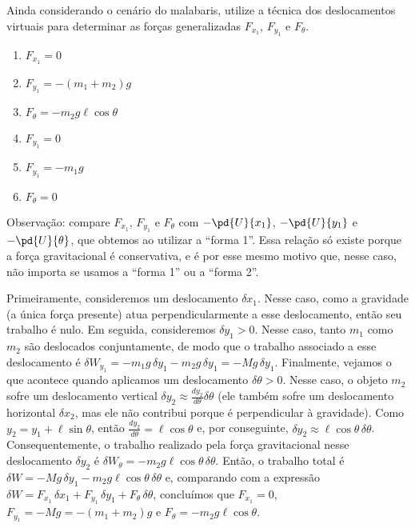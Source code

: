\begin{question}
  	Ainda considerando o cenário do malabaris, utilize a técnica dos deslocamentos virtuais para determinar as forças generalizadas $F_{x_1}$, $F_{y_1}$ e $F_\theta$.

  	\begin{enumerate}
  		\item $F_{x_1} = 0$ \rightanswer
  		\item $F_{y_1} = -(m_1 + m_2)g$ \rightanswer
  		\item $F_\theta = -m_2 g \ell \cos\theta$ \rightanswer
  		\item $F_{y_1} = 0$
  		\item $F_{y_1} = -m_1g$
  		\item $F_\theta = 0$
  	\end{enumerate}

  	\bigskip
  	\begin{compactdesc}
  		\item[Observação:] compare $F_{x_1}$, $F_{y_1}$ e $F_{\theta}$ com $-\pd{U}{x_1}$, $-\pd{U}{y_1}$ e $-\pd{U}{\theta}$, que obtemos ao utilizar a ``forma 1''.
  		Essa relação só existe porque a força gravitacional é conservativa, e é por esse mesmo motivo que, nesse caso, não importa se usamos a ``forma 1'' ou a ``forma 2''.
  	\end{compactdesc}

    \begin{solution}
      Primeiramente, consideremos um deslocamento $\delta x_1$.
      Nesse caso, como a gravidade (a única força presente) atua perpendicularmente a esse deslocamento, então seu trabalho é nulo.
      Em seguida, consideremos $\delta y_1 > 0$.
      Nesse caso, tanto $m_1$ como $m_2$ são deslocados conjuntamente, de modo que o trabalho associado a esse deslocamento é $\delta W_{y_1} = -m_1g\,\delta y_1 - m_2g\,\delta y_1 = -Mg\,\delta y_1$.
      Finalmente, vejamos o que acontece quando aplicamos um deslocamento $\delta\theta > 0$.
      Nesse caso, o objeto $m_2$ sofre um deslocamento vertical $\delta y_2 \approx \frac{dy_2}{d\theta} \delta\theta$ (ele também sofre um deslocamento horizontal $\delta x_2$, mas ele não contribui porque é perpendicular à gravidade).
      Como $y_2 = y_1 + \ell \sin \theta$, então $\frac{dy_2}{d\theta} = \ell\cos\theta$ e, por conseguinte, $\delta y_2 \approx \ell\cos\theta\, \delta\theta$.
      Consequentemente, o trabalho realizado pela força gravitacional nesse deslocamento $\delta y_2$ é $\delta W_{\theta} = -m_2g\ell\cos\theta\, \delta\theta$.
      Então, o trabalho total é $\delta W = -Mg\,\delta y_1 -m_2g\ell\cos\theta\, \delta\theta$ e, comparando com a expressão $\delta W = F_{x_1}\,\delta x_1 + F_{y_1}\,\delta y_1 + F_{\theta}\,\delta \theta$, concluímos que $F_{x_1} = 0$, $F_{y_1} = -Mg = -(m_1 + m_2)g$ e $F_{\theta} = -m_2g\ell\cos\theta$.
    \end{solution}
\end{question}